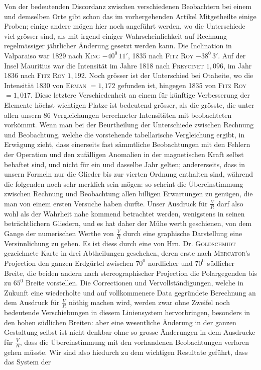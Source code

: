 \expandafter\def\csname HistoricalNoteText20\endcsname{Von der bedeutenden Discordanz zwischen verschiedenen Beobachtern bei einem und demselben Orte gibt schon das im vorhergehenden Artikel Mitgetheilte einige Proben; einige andere mögen hier noch angeführt werden, wo die Unterschiede viel grösser sind, als mit irgend einiger Wahrscheinlichkeit auf Rechnung regelmässiger jährlicher Änderung gesetzt werden kann. Die Inclination in Valparaiso war 1829 nach \textsc{King} $-40^0\,11'$, 1835 nach \textsc{Fitz Roy} $-38^0\,3'$. Auf der Insel Mauritius war die Intensität im Jahre 1818 nach \textsc{Freycinet} $1{,}096$, im Jahr 1836 nach \textsc{Fitz Roy} $1{,}192$. Noch grösser ist der Unterschied bei Otaheite, wo die Intensität 1830 von \textsc{Erman} $=1{,}172$ gefunden ist, hingegen 1835 von \textsc{Fitz Roy} $=1{,}017$. Diese letztere Verschiedenheit an einem für künftige Verbesserung der Elemente höchst wichtigen Platze ist bedeutend grösser, als die grösste, die unter allen unsern 86 Vergleichungen berechneter Intensitäten mit beobachteten vorkömmt.}
Wenn man bei der Beurtheilung der Unterschiede zwischen Rechnung und Beobachtung, welche die vorstehende tabellarische Vergleichung ergibt, in Erwägung zieht, dass einerseits fast sämmtliche Beobachtungen mit den Fehlern der Operation und den zufälligen Anomalien in der magnetischen Kraft selbst behaftet sind, und nicht für ein und dasselbe Jahr gelten; andererseits, dass in unsern Formeln nur die Glieder bis zur vierten Ordnung enthalten sind, während die folgenden noch sehr merklich sein mögen: so scheint die Übereinstimmung zwischen Rechnung und Beobachtung allen billigen Erwartungen zu genügen, die man von einem ersten Versuche haben durfte. Unser Ausdruck für $\frac VR$ darf also wohl als der Wahrheit nahe kommend betrachtet werden, wenigstens in seinen beträchtlichern Gliedern, und es hat daher der Mühe werth geschienen, von dem Gange der numerischen Werthe von $\frac VR$ durch eine graphische Darstellung eine Versinnlichung zu geben. Es ist diess durch eine von Hrn. Dr. \textsc{Goldschmidt} gezeichnete Karte in drei Abtheilungen geschehen, deren erste nach \textsc{Mercator}’s Projection den ganzen Erdgürtel zwischen $70^0$ nordlicher und $70^0$ südlicher Breite, die beiden andern nach stereographischer Projection die Polargegenden bis zu $65^0$ Breite vorstellen. Die Correctionen und Vervollständigungen, welche in Zukunft eine wiederholte und auf vollkommenere Data gegründete Berechnung an dem Ausdruck für $\frac VR$ nöthig machen wird, werden zwar ohne Zweifel noch bedeutende Verschiebungen in diesem Liniensystem hervorbringen, besonders in den hohen südlichen Breiten: aber eine wesentliche Änderung in der ganzen Gestaltung selbst ist nicht denkbar ohne so grosse Änderungen in dem Ausdrucke für $\frac VR$, dass die Übereinstimmung mit den vorhandenen Beobachtungen verloren gehen müsste. Wir sind also hiedurch zu dem wichtigen Resultate geführt, dass das System der
